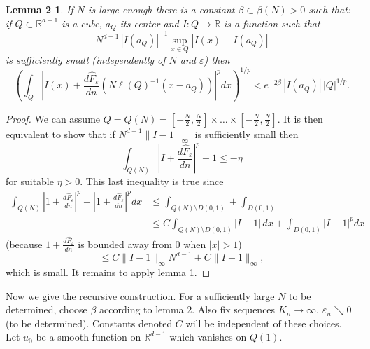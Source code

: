 \documentclass[11pt,reqno]{amsart}
\newtheorem*{lemB}{Lemma 2}
\newcommand{\Rdm}{\mathbb{R}^{d-1}}
\newcommand{\dn}[1]{\frac{d#1}{dn}}
\newcommand{\he}[1]{\widehat{#1}}          %
\begin{document}
\begin{lemB}
If $N$ is large enough there is a constant $\beta\subset\beta(N)>0$ such that:
if $Q\subset\Rdm$ is a cube, $a_Q$ its center and $I:Q\to\mathbb{R}$ is a function
such that
\begin{equation*}
  N^{d-1}\,|I(a_Q)|^{-1}\sup_{x\in Q}|I(x)-I(a_Q)|
\end{equation*}
is sufficiently small (independently of $N$ and $\varepsilon$) then
\begin{equation*}
 \left(\int_Q\left|I(x)+\dn{\he{F}_\varepsilon}\!\left(N\ell(Q)^{-1}(x-a_Q)\right)\right|^{p}dx\right)^{1/p}
  < e^{-2\beta}\,|I(a_Q)|\,|Q|^{1/p}.
\end{equation*}
\end{lemB}

\begin{proof}
We can assume $Q=Q(N)=\left[-\tfrac{N}{2},\tfrac{N}{2}\right]\times\dots\times
\left[-\tfrac{N}{2},\tfrac{N}{2}\right]$.  It is then equivalent to show that if
$N^{d-1}\|I-1\|_\infty$ is sufficiently small then
\begin{equation*}
 \int_{Q(N)}\left|I+\dn{\he{F}_\varepsilon}\right|^{p}-1\leq-\eta
\end{equation*}
for suitable $\eta>0$.  This last inequality is true since
\begin{align*}
 \int_{Q(N)}\left|1+\dn{\he{F}_\varepsilon}\right|^{p}
  -\left|1+\dn{\he{F}_\varepsilon}\right|^{p}dx
 &\leq\int_{Q(N)\setminus D(0,1)}+\int_{D(0,1)}\\
 &\leq C\int_{Q(N)\setminus D(0,1)}|I-1|\,dx+\int_{D(0,1)}|I-1|^{p}dx
\end{align*}
(because $1+\dn{\he{F}_\varepsilon}$ is bounded away from $0$ when $|x|>1$)
\begin{equation*}
 \leq C\|I-1\|_\infty N^{d-1}+C\|I-1\|_\infty ,
\end{equation*}
which is small.  It remains to apply lemma 1.
\end{proof}

Now we give the recursive construction.  For a sufficiently large $N$ to be
determined, choose $\beta$ according to lemma 2.  Also fix sequences
$K_n\to\infty$, $\varepsilon_n\searrow 0$ (to be determined).  Constants denoted
$C$ will be independent of these choices.  Let $u_0$ be a smooth function on
$\Rdm$ which vanishes on $Q(1)$.
\end{document}
